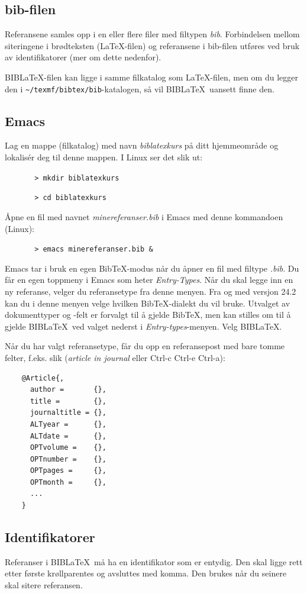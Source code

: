 \documentclass[11pt,norsk,a4paper]{article}
\newcommand{\bt}{BibTeX{}}
\newcommand{\blt}{B{\smaller[2]IB}\discretionary{-}{}{\kern
    -0.12em}\LaTeX{}}
\begin{document}
\subsection{bib-filen}
Referansene samles opp i en eller flere filer med filtypen
\textit{bib}. Forbindelsen mellom siteringene i brødteksten
(\LaTeX-filen) og referansene i bib-filen utføres ved bruk av
identifikatorer (mer om dette nedenfor).

\blt-filen kan ligge i samme filkatalog som \LaTeX-filen, men om du
legger den i \verb=~/texmf/bibtex/bib=-katalogen, så vil \blt\ uansett
finne den.


\subsection{Emacs}
Lag en mappe (filkatalog) med navn \textit{biblatexkurs} på ditt
hjemmeområde og lokalisér deg til denne mappen. I Linux ser det slik ut:

\verb=       > mkdir biblatexkurs =

\verb=       > cd biblatexkurs =

\noindent{}Åpne en fil med navnet \textit{minereferanser.bib} i Emacs med denne
kommandoen (Linux):

\verb=       > emacs minereferanser.bib &=

\noindent{}Emacs tar i bruk en egen \bt-modus når du åpner en fil med filtype
\textit{.bib}.  Du får en egen toppmeny i Emacs som heter \textit{Entry-Types}. Når du
skal legge inn en ny referanse, velger du referansetype fra denne
menyen. Fra og med versjon 24.2 kan du i denne menyen velge hvilken \bt-dialekt du vil bruke. Utvalget av dokumenttyper og -felt er forvalgt til å gjelde \bt, men kan stilles om til å gjelde \blt\ ved valget nederst i \textit{Entry-types}-menyen. Velg \blt.

Når du har valgt referansetype, får du opp en referansepost med bare
tomme felter, f.eks. slik (\textit{article in journal} eller Ctrl-c Ctrl-e
Ctrl-a):

{\footnotesize\begin{verbatim}
    @Article{,
      author =       {},
      title =        {},
      journaltitle = {},
      ALTyear =      {},
      ALTdate =      {},
      OPTvolume =    {},
      OPTnumber =    {},
      OPTpages =     {},
      OPTmonth =     {},
      ...
    }
\end{verbatim}}




\subsection*{Identifikatorer}
Referanser i \blt\ må ha en identifikator som er entydig. Den skal
ligge rett etter første krøllparentes og avsluttes med komma. Den
brukes når du seinere skal sitere referansen.
\end{document}
